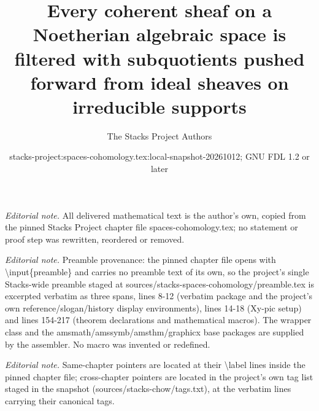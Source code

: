 \documentclass[10pt,a4paper]{amsart}
\title{Every coherent sheaf on a Noetherian algebraic space is filtered with subquotients pushed forward from ideal sheaves on irreducible supports}
\author{The Stacks Project Authors}
\date{stacks-project:spaces-cohomology.tex:local-snapshot-20261012; GNU FDL 1.2 or later}
\theoremstyle{plain}
\theoremstyle{definition}
\theoremstyle{remark}
\numberwithin{equation}{subsection}
\begin{document}
\maketitle
\noindent\textit{Editorial note.} All delivered mathematical text is the author's own, copied from the pinned Stacks Project chapter file spaces-cohomology.tex; no statement or proof step was rewritten, reordered or removed.\par\medskip
\noindent\textit{Editorial note.} Preamble provenance: the pinned chapter file opens with \textbackslash{}input\{preamble\} and carries no preamble text of its own, so the project's single Stacks-wide preamble staged at sources/stacks-spaces-cohomology/preamble.tex is excerpted verbatim as three spans, lines 8-12 (verbatim package and the project's own reference/slogan/history display environments), lines 14-18 (Xy-pic setup) and lines 154-217 (theorem declarations and mathematical macros). The wrapper class and the amsmath/amssymb/amsthm/graphicx base packages are supplied by the assembler. No macro was invented or redefined.\par\medskip
\noindent\textit{Editorial note.} Same-chapter pointers are located at their \textbackslash{}label lines inside the pinned chapter file; cross-chapter pointers are located in the project's own tag list staged in the snapshot (sources/stacks-chow/tags.txt), at the verbatim lines carrying their canonical tags.\par\medskip
\end{document}
